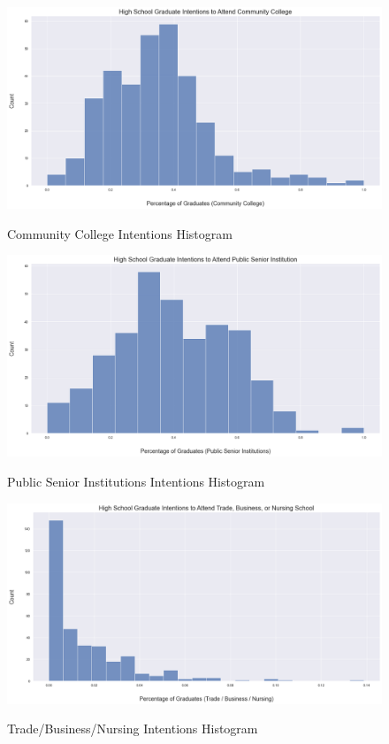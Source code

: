 \documentclass[stu, 12pt, floatsintext]{apa7}
\begin{document}
\begin{figure}
    \caption{Community College Intentions Histogram}
    \includegraphics[width=17cm]{int_commcoll_histogram.png}
    \label{fig9}
\end{figure}

\begin{figure}
    \caption{Public Senior Institutions Intentions Histogram}
    \includegraphics[width=17cm]{int_pubsr_histogram.png}
    \label{fig10}
\end{figure}

\begin{figure}
    \caption{Trade/Business/Nursing Intentions Histogram}
    \includegraphics[width=17cm]{int_trdbusnrs_histogram.png}
    \label{fig11}
\end{figure}


\end{document}
